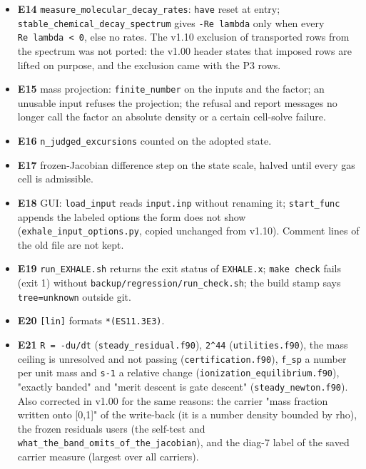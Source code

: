 \documentclass[english,a4paper]{my_memo}
\begin{document}
\begin{itemize}
  \textbf{E13} \texttt{squared\_residual\_directional\_derivative}: the trust-region ray slope is a central or one-sided quotient over admitted probes only.
\item
  \textbf{E14} \texttt{measure\_molecular\_decay\_rates}: \texttt{have} reset at entry; \texttt{stable\_chemical\_decay\_spectrum} gives \texttt{-Re\ lambda} only when every \texttt{Re\ lambda\ \textless{}\ 0}, else no rates. The v1.10 exclusion of transported rows from the spectrum was not ported: the v1.00 header states that imposed rows are lifted on purpose, and the exclusion came with the P3 rows.
\item
  \textbf{E15} mass projection: \texttt{finite\_number} on the inputs and the factor; an unusable input refuses the projection; the refusal and report messages no longer call the factor an absolute density or a certain cell-solve failure.
\item
  \textbf{E16} \texttt{n\_judged\_excursions} counted on the adopted state.
\item
  \textbf{E17} frozen-Jacobian difference step on the state scale, halved until every gas cell is admissible.
\item
  \textbf{E18} GUI: \texttt{load\_input} reads \texttt{input.inp} without renaming it; \texttt{start\_func} appends the labeled options the form does not show (\texttt{exhale\_input\_options.py}, copied unchanged from v1.10). Comment lines of the old file are not kept.
\item
  \textbf{E19} \texttt{run\_EXHALE.sh} returns the exit status of \texttt{EXHALE.x}; \texttt{make\ check} fails (exit 1) without \texttt{backup/regression/run\_check.sh}; the build stamp says \texttt{tree=unknown} outside git.
\item
  \textbf{E20} \texttt{{[}lin{]}} formats \texttt{*(ES11.3E3)}.
\item
  \textbf{E21} \texttt{R\ =\ -du/dt} (\texttt{steady\_residual.f90}), \texttt{2\^{}44} (\texttt{utilities.f90}), the mass ceiling is unresolved and not passing (\texttt{certification.f90}), \texttt{f\_sp} a number per unit mass and \texttt{\textbar{}s-1\textbar{}} a relative change (\texttt{ionization\_equilibrium.f90}), "exactly banded" and "merit descent is gate descent" (\texttt{steady\_newton.f90}). Also corrected in v1.00 for the same reasons: the carrier "mass fraction written onto {[}0,1{]}" of the write-back (it is a number density bounded by rho), the frozen residual\textquotesingle s users (the self-test and \texttt{what\_the\_band\_omits\_of\_the\_jacobian}), and the diag-7 label of the saved carrier measure (largest over all carriers).
\end{itemize}
\end{document}
